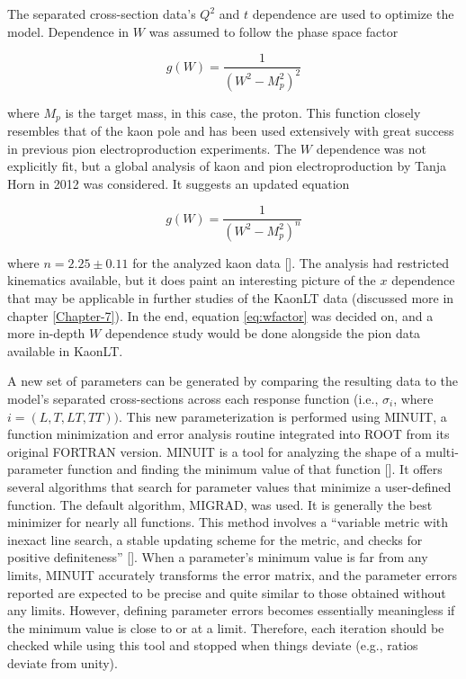 \documentclass[
]{report}
\begin{document}
The separated cross-section data's \(Q^2\) and \(t\) dependence are used
to optimize the model. Dependence in \(W\) was assumed to follow the
phase space factor

\begin{equation} 
    g(W)=\frac{1}{(W^2-M_p^2)^2}
  \label{eq:wfactor} 
\end{equation}

\noindent where \(M_p\) is the target mass, in this case, the proton.
This function closely resembles that of the kaon pole and has been used
extensively with great success in previous pion electroproduction
experiments. The \(W\) dependence was not explicitly fit, but a global
analysis of kaon and pion electroproduction by Tanja Horn in 2012 was
considered. It suggests an updated equation

\begin{equation} 
    g(W)=\frac{1}{(W^2-M_p^2)^n}
  \label{eq:wfactor_n} 
\end{equation}

\noindent where \(n=2.25\pm0.11\) for the analyzed kaon data
{[}\cite{horn_global_2012}{]}. The analysis had restricted kinematics
available, but it does paint an interesting picture of the \(x\)
dependence that may be applicable in further studies of the KaonLT data
(discussed more in chapter \ref{Chapter-7}). In the end, equation
\ref{eq:wfactor} was decided on, and a more in-depth \(W\) dependence
study would be done alongside the pion data available in KaonLT.

A new set of parameters can be generated by comparing the resulting data
to the model's separated cross-sections across each response function
(i.e., \(\sigma_i\), where \(i=(L, T, LT, TT))\). This new
parameterization is performed using MINUIT, a function minimization and
error analysis routine integrated into ROOT from its original FORTRAN
version. MINUIT is a tool for analyzing the shape of a multi-parameter
function and finding the minimum value of that function
{[}\cite{f_james_minuit_1994}{]}. It offers several algorithms that
search for parameter values that minimize a user-defined function. The
default algorithm, MIGRAD, was used. It is generally the best minimizer
for nearly all functions. This method involves a ``variable metric with
inexact line search, a stable updating scheme for the metric, and checks
for positive definiteness'' {[}\cite{root_community_root_2024}{]}. When
a parameter's minimum value is far from any limits, MINUIT accurately
transforms the error matrix, and the parameter errors reported are
expected to be precise and quite similar to those obtained without any
limits. However, defining parameter errors becomes essentially
meaningless if the minimum value is close to or at a limit. Therefore,
each iteration should be checked while using this tool and stopped when
things deviate (e.g., ratios deviate from unity).
\end{document}
